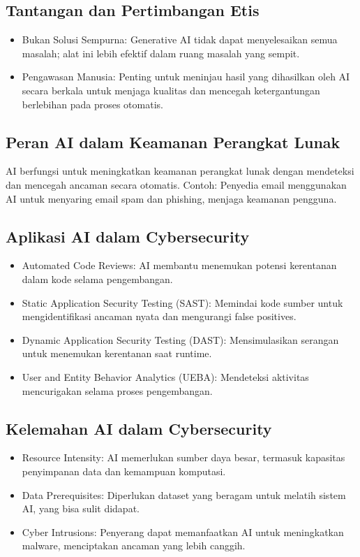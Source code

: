 \documentclass{article}
\begin{document}
\subsection{Tantangan dan Pertimbangan Etis}
\begin{itemize}
    \item Bukan Solusi Sempurna: Generative AI tidak dapat menyelesaikan semua masalah; alat ini lebih efektif dalam ruang masalah yang sempit.
    \item Pengawasan Manusia: Penting untuk meninjau hasil yang dihasilkan oleh AI secara berkala untuk menjaga kualitas dan mencegah ketergantungan berlebihan pada proses otomatis.
\end{itemize}

\subsection{Peran AI dalam Keamanan Perangkat Lunak}
AI berfungsi untuk meningkatkan keamanan perangkat lunak dengan mendeteksi dan mencegah ancaman secara otomatis. Contoh: Penyedia email menggunakan AI untuk menyaring email spam dan phishing, menjaga keamanan pengguna.

\subsection{Aplikasi AI dalam Cybersecurity}
\begin{itemize}
    \item Automated Code Reviews: AI membantu menemukan potensi kerentanan dalam kode selama pengembangan.
    \item Static Application Security Testing (SAST): Memindai kode sumber untuk mengidentifikasi ancaman nyata dan mengurangi false positives.
    \item Dynamic Application Security Testing (DAST): Mensimulasikan serangan untuk menemukan kerentanan saat runtime.
    \item User and Entity Behavior Analytics (UEBA): Mendeteksi aktivitas mencurigakan selama proses pengembangan.
\end{itemize}

\subsection{Kelemahan AI dalam Cybersecurity}
\begin{itemize}
    \item Resource Intensity: AI memerlukan sumber daya besar, termasuk kapasitas penyimpanan data dan kemampuan komputasi.
    \item Data Prerequisites: Diperlukan dataset yang beragam untuk melatih sistem AI, yang bisa sulit didapat.
    \item Cyber Intrusions: Penyerang dapat memanfaatkan AI untuk meningkatkan malware, menciptakan ancaman yang lebih canggih.
\end{itemize}
\end{document}
